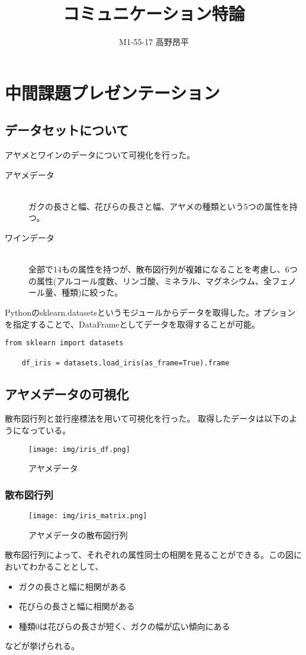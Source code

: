 \documentclass{jsarticle}
\title{コミュニケーション特論}
\author{M1-55-17 高野昂平}
\date{}
\begin{document}
\maketitle

\section{中間課題プレゼンテーション}
\subsection{データセットについて}
アヤメとワインのデータについて可視化を行った。
\begin{description}
    \item[アヤメデータ] \mbox{}\\
        ガクの長さと幅、花びらの長さと幅、アヤメの種類という5つの属性を持つ。
    \item[ワインデータ] \mbox{}\\
        全部で14もの属性を持つが、散布図行列が複雑になることを考慮し、6つの属性(アルコール度数、リンゴ酸、ミネラル、マグネシウム、全フェノール量、種類)に絞った。
\end{description}
\par Pythonのsklearn.datasetsというモジュールからデータを取得した。オプションを指定することで、DataFrameとしてデータを取得することが可能。
\begin{lstlisting}[caption = データセットの取得]
    from sklearn import datasets

    df_iris = datasets.load_iris(as_frame=True).frame
\end{lstlisting}
\newpage
\subsection{アヤメデータの可視化}
散布図行列と並行座標法を用いて可視化を行った。
取得したデータは以下のようになっている。
\begin{figure}[htbp]
    \begin{center}
        \texttt{[image: img/iris\_df.png]}
        \caption{アヤメデータ}
        \label{fig:iris_df}
    \end{center}
\end{figure}
\subsubsection{散布図行列}
\begin{figure}[htbp]
    \begin{center}
        \texttt{[image: img/iris\_matrix.png]}
        \caption{アヤメデータの散布図行列}
        \label{fig:iris_matrix}
    \end{center}
\end{figure}
散布図行列によって、それぞれの属性同士の相関を見ることができる。この図においてわかることとして、
\begin{itemize}
    \item ガクの長さと幅に相関がある
    \item 花びらの長さと幅に相関がある
    \item 種類0は花びらの長さが短く、ガクの幅が広い傾向にある
\end{itemize}
などが挙げられる。
\end{document}

